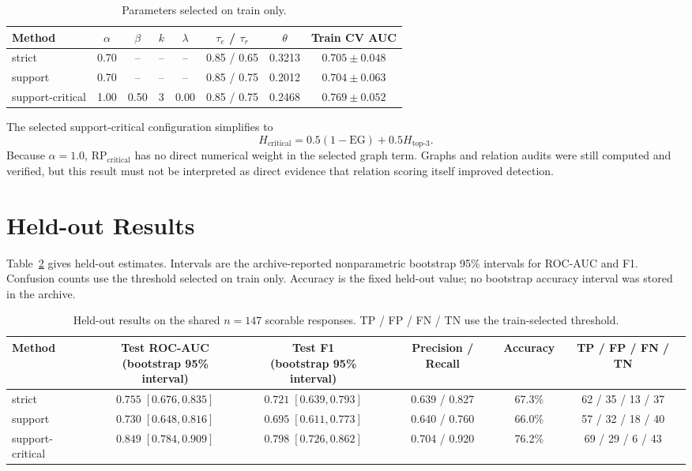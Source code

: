 \documentclass[11pt,a4paper]{article}
\newcommand{\EG}{\mathrm{EG}}
\newcommand{\RP}{\mathrm{RP}}
\newcommand{\Hc}{H_{\mathrm{critical}}}
\begin{document}
\begin{table}[h]
\centering
\caption{Parameters selected on train only.}
\label{tab:parameters}
\small
\begin{tabular}{@{}lccccccc@{}}
\toprule
Method & $\alpha$ & $\beta$ & $k$ & $\lambda$ & $\tau_e$ / $\tau_r$ & $\theta$ & Train CV AUC \\
\midrule
strict & 0.70 & -- & -- & -- & 0.85 / 0.65 & 0.3213 & $0.705\pm0.048$ \\
support & 0.70 & -- & -- & -- & 0.85 / 0.75 & 0.2012 & $0.704\pm0.063$ \\
support-critical & 1.00 & 0.50 & 3 & 0.00 & 0.85 / 0.75 & 0.2468 & $0.769\pm0.052$ \\
\bottomrule
\end{tabular}
\end{table}

The selected support-critical configuration simplifies to
\begin{equation}
\Hc=0.5(1-\EG)+0.5H_{\mathrm{top}\text{-}3}.
\end{equation}
Because $\alpha=1.0$, $\RP_{\mathrm{critical}}$ has no direct numerical weight in the selected graph term.  Graphs and relation audits were still computed and verified, but this result must not be interpreted as direct evidence that relation scoring itself improved detection.

\section{Held-out Results}
Table~\ref{tab:results} gives held-out estimates.  Intervals are the archive-reported nonparametric bootstrap 95\% intervals for ROC-AUC and F1.  Confusion counts use the threshold selected on train only.  Accuracy is the fixed held-out value; no bootstrap accuracy interval was stored in the archive.

\begin{table}[h]
\centering
\caption{Held-out results on the shared $n=147$ scorable responses.  TP / FP / FN / TN use the train-selected threshold.}
\label{tab:results}
\scriptsize
\begin{tabular}{@{}lccccc@{}}
\toprule
Method & \shortstack{Test ROC-AUC\\(bootstrap 95\% interval)} & \shortstack{Test F1\\(bootstrap 95\% interval)} & Precision / Recall & Accuracy & TP / FP / FN / TN \\
\midrule
strict & $0.755\;[0.676,0.835]$ & $0.721\;[0.639,0.793]$ & 0.639 / 0.827 & 67.3\% & 62 / 35 / 13 / 37 \\
support & $0.730\;[0.648,0.816]$ & $0.695\;[0.611,0.773]$ & 0.640 / 0.760 & 66.0\% & 57 / 32 / 18 / 40 \\
support-critical & $0.849\;[0.784,0.909]$ & $0.798\;[0.726,0.862]$ & 0.704 / 0.920 & 76.2\% & 69 / 29 / 6 / 43 \\
\bottomrule
\end{tabular}
\end{table}
\end{document}
